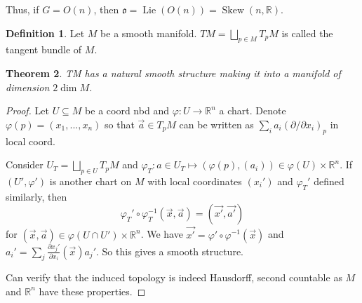 \documentclass{article}
\theoremstyle{definition}
\newtheorem{defn}{Definition}[section]
\theoremstyle{remark}
\theoremstyle{plain}
\newtheorem{thm}[defn]{Theorem}
\newcommand{\RR}{\mathbb{R}}
\begin{document}
Thus, if $G=O(n)$, then $\mathfrak{o}=\operatorname{Lie}(O(n))=\operatorname{Skew}(n,\RR)$.
\begin{defn}
    Let $M$ be a smooth manifold. $TM=\bigsqcup_{p\in M}T_pM$ is called the tangent bundle of $M$.
\end{defn}
\begin{thm}
    TM has a natural smooth structure making it into a manifold of dimension $2\dim M$.
\end{thm}
\begin{proof}
    Let $U\subseteq M$ be a coord nbd and $\varphi:U\to\RR^n$ a chart. Denote $\varphi(p)=(x_1,...,x_n)$ so that $\Vec{a}\in T_pM$ can be written as $\sum_ia_i(\partial/\partial x_i)_p$ in local coord.

    Consider $U_T=\bigsqcup_{p\in U}T_pM$ and $\varphi_T:a\in U_T\mapsto (\varphi(p),(a_i))\in\varphi(U)\times\RR^n$. If $(U',\varphi')$ is another chart on $M$ with local coordinates $(x_i')$ and $\varphi_T'$ defined similarly, then
    \[\varphi_T'\circ\varphi_T^{-1}(\Vec{x},\Vec{a})=(\Vec{x'},\Vec{a'})\] for $(\Vec{x},\Vec{a})\in\varphi(U\cap U')\times\RR^n$.
    We have $\Vec{x'}=\varphi'\circ\varphi^{-1}(\Vec{x})$ and $a_i'=\sum_j\frac{\partial x_j'}{\partial x_i}(\Vec{x})a_j'$. So this gives a smooth structure.

    Can verify that the induced topology is indeed Hausdorff, second countable as $M$ and $\RR^n$ have these properties.
\end{proof}
\end{document}

